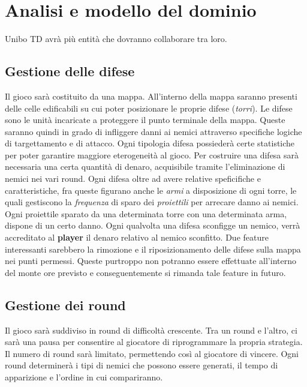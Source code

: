 \documentclass[a4paper,12pt]{report}
\begin{document}
\section{Analisi e modello del dominio}

Unibo TD avrà più entità che dovranno collaborare tra loro.

\subsection*{Gestione delle difese}
\begin{itemize}
Il gioco sarà costituito da una mappa. All'interno della mappa saranno presenti delle celle edificabili su cui poter posizionare le proprie difese (\textit{torri}). 
Le difese sono le unità incaricate a proteggere il punto terminale della mappa. Queste saranno quindi in grado di infliggere danni ai nemici attraverso specifiche logiche di targettamento e di attacco. Ogni tipologia difesa possiederà certe statistiche per poter garantire maggiore eterogeneità al gioco. Per costruire una difesa sarà necessaria una certa quantità di denaro, acquisibile tramite l'eliminazione di nemici nei vari round. Ogni difesa oltre ad avere relative speficifiche e caratteristiche, fra queste figurano anche le \textit{armi} a disposizione di ogni torre, le quali gestiscono la \textit{frequenza} di sparo dei \textit{proiettili} per arrecare danno ai nemici. Ogni proiettile sparato da una determinata torre con una determinata arma, dispone di un certo danno. Ogni qualvolta una difesa sconfigge un nemico, verrà accreditato al \textbf{player} il denaro relativo al nemico sconfitto. Due feature interessanti sarebbero la rimozione e il riposizionamento delle difese sulla mappa nei punti permessi. Queste purtroppo non potranno essere effettuate all’interno del monte ore previsto e conseguentemente si rimanda tale feature in futuro.
\end{itemize}

\subsection*{Gestione dei round}
Il gioco sarà suddiviso in round di difficoltà crescente. Tra un round e l'altro, ci sarà una pausa per consentire al giocatore di riprogrammare la propria strategia. Il numero di round sarà limitato, permettendo così al giocatore di vincere.
Ogni round determinerà i tipi di nemici che possono essere generati, il tempo di apparizione e l'ordine in cui compariranno.
\end{document}
